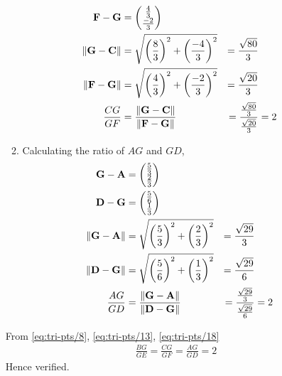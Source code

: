 \documentclass[11pt]{book}
\begin{document}
\begin{enumerate}[label=\thesection.\arabic*.,ref=\thesection.\theenumi]
\begin{enumerate}
\begin{align}
		\label{eq:tri-pts/10} \vec{F}-\vec{G} &= \myvec{\frac{4}{3} \\ \frac{-2}{3}} \\
		\label{eq:tri-pts/11} \norm{\vec{G}-\vec{C}} &= \sqrt{\brak{\frac{8}{3}}^{2} + \brak{\frac{-4}{3}}^{2}} &= \frac{\sqrt{80}}{3} \\  
		\label{eq:tri-pts/12} \norm{\vec{F}-\vec{G}} &= \sqrt{\brak{\frac{4}{3}}^{2} + \brak{\frac{-2}{3}}^{2}} &= \frac{\sqrt{20}}{3} \\
		\label{eq:tri-pts/13}\frac{CG}{GF} &= \frac{\norm{\vec{G}-\vec{C}}}{\norm{\vec{F}-\vec{G}}} &= \frac{\frac{\sqrt{80}}{3}}{\frac{\sqrt{20}}{3}} &= 2		
\end{align}
\item Calculating the ratio of $AG$ and $GD$,
\begin{align}
		\label{eq:tri-pts/14} \vec{G}-\vec{A} &= \myvec{\frac{5}{3} \\ \frac{2}{3}} \\
		\label{eq:tri-pts/15} \vec{D}-\vec{G} &= \myvec{\frac{5}{6} \\ \frac{1}{3}} \\
		\label{eq:tri-pts/16} \norm{\vec{G}-\vec{A}} &= \sqrt{\brak{\frac{5}{3}}^{2} + \brak{\frac{2}{3}}^{2}} &= \frac{\sqrt{29}}{3} \\
		\label{eq:tri-pts/17} \norm{\vec{D}-\vec{G}} &= \sqrt{\brak{\frac{5}{6}}^{2}+\brak{\frac{1}{3}}^{2}} &= \frac{\sqrt{29}}{6} \\
		\label{eq:tri-pts/18}\frac{AG}{GD} &= \frac{\norm{\vec{G}-\vec{A}}}{\norm{\vec{D}-\vec{G}}} &= \frac{\frac{\sqrt{29}}{3}}{\frac{\sqrt{29}}{6}} &= 2 
\end{align}
\end{enumerate}

From \eqref{eq:tri-pts/8}, \eqref{eq:tri-pts/13}, \eqref{eq:tri-pts/18}
\begin{align}
		\frac{BG}{GE} = 
		\frac{CG}{GF} =
		\frac{AG}{GD} = 2
\end{align}
Hence verified.




\end{enumerate}
\end{document}
